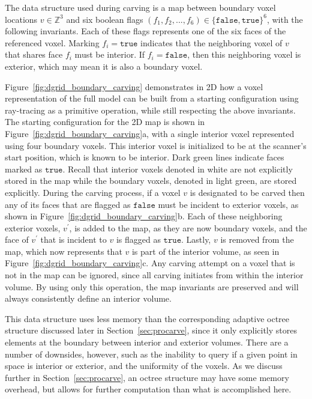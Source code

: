 \documentclass[12pt,onecolumn,oneside]{book}
\begin{document}
The data structure used during carving is a map between boundary voxel locations $v \in \mathbb{Z}^3$ and six boolean flags $(f_1,f_2,...,f_6) \in \{\texttt{false},\texttt{true}\}^6$, with the following invariants.  Each of these flags represents one of the six faces of the referenced voxel.  Marking $f_i = \texttt{true}$ indicates that the neighboring voxel of $v$ that shares face $f_i$ must be interior.  If $f_i = \texttt{false}$, then this neighboring voxel is exterior, which may mean it is also a boundary voxel.

Figure~\ref{fig:dgrid_boundary_carving} demonstrates in 2D how a voxel representation of the full model can be built from a starting configuration using ray-tracing as a primitive operation, while still respecting the above invariants.  The starting configuration for the 2D map is shown in Figure~\ref{fig:dgrid_boundary_carving}a, with a single interior voxel represented using four boundary voxels.  This interior voxel is initialized to be at the scanner's start position, which is known to be interior.  Dark green lines indicate faces marked as $\texttt{true}$.  Recall that interior voxels denoted in white are not explicitly stored in the map while the boundary voxels, denoted in light green, are stored explicitly.  During the carving process, if a voxel $v$ is designated to be carved then any of its faces that are flagged as $\texttt{false}$ must be incident to exterior voxels, as shown in Figure~\ref{fig:dgrid_boundary_carving}b.  Each of these neighboring exterior voxels, $v^{\prime}$, is added to the map, as they are now boundary voxels, and the face of $v^{\prime}$ that is incident to $v$ is flagged as $\texttt{true}$.  Lastly, $v$ is removed from the map, which now represents that $v$ is part of the interior volume, as seen in Figure~\ref{fig:dgrid_boundary_carving}c.  Any carving attempt on a voxel that is not in the map can be ignored, since all carving initiates from within the interior volume.  By using only this operation, the map invariants are preserved and will always consistently define an interior volume.

This data structure uses less memory than the corresponding adaptive octree structure discussed later in Section~\ref{sec:procarve}, since it only explicitly stores elements at the boundary between interior and exterior volumes.  There are a number of downsides, however, such as the inability to query if a given point in space is interior or exterior, and the uniformity of the voxels.  As we discuss further in Section~\ref{sec:procarve}, an octree structure may have some memory overhead, but allows for further computation than what is accomplished here.
\end{document}
